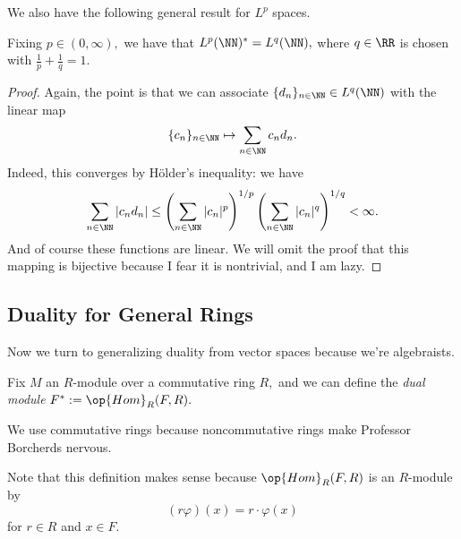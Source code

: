 \documentclass[../notes.tex]{subfiles}
\begin{document}
We also have the following general result for $L^p$ spaces.
\begin{exercise}
	Fixing $p\in(0,\infty),$ we have that $L^p(\NN)^*=L^q(\NN),$ where $q\in\RR$ is chosen with $\frac1p+\frac1q=1.$
\end{exercise}
\begin{proof}
	Again, the point is that we can associate $\{d_n\}_{n\in\NN}\in L^q(\NN)$ with the linear map
	\[\{c_n\}_{n\in\NN}\mapsto\sum_{n\in\NN}c_nd_n.\]
	Indeed, this converges by H\"older's inequality: we have
	\[\sum_{n\in\NN}|c_nd_n|\le\left(\sum_{n\in\NN}|c_n|^p\right)^{1/p}\left(\sum_{n\in\NN}|c_n|^q\right)^{1/q}<\infty.\]
	And of course these functions are linear. We will omit the proof that this mapping is bijective because I fear it is nontrivial, and I am lazy.
\end{proof}

\subsection{Duality for General Rings}
Now we turn to generalizing duality from vector spaces because we're algebraists.
\begin{definition}
	Fix $M$ an $R$-module over a commutative ring $R,$ and we can define the \textit{dual module} $F^*:=\op{Hom}_R(F,R).$
\end{definition}
\begin{remark}
	We use commutative rings because noncommutative rings make Professor Borcherds nervous.
\end{remark}
Note that this definition makes sense because $\op{Hom}_R(F,R)$ is an $R$-module by
\[(r\varphi)(x)=r\cdot\varphi(x)\]
for $r\in R$ and $x\in F.$
\end{document}
